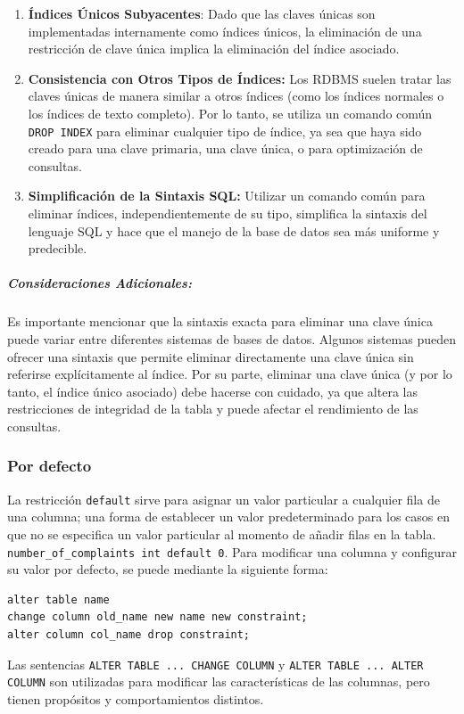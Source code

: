 \begin{enumerate}
    \item \textbf{Índices Únicos Subyacentes}: Dado que las claves únicas son implementadas internamente como índices únicos, la eliminación de una restricción de clave única implica la eliminación del índice asociado.
    \item \textbf{Consistencia con Otros Tipos de Índices:} Los RDBMS suelen tratar las claves únicas de manera similar a otros índices (como los índices normales o los índices de texto completo). Por lo tanto, se utiliza un comando común \texttt{DROP INDEX} para eliminar cualquier tipo de índice, ya sea que haya sido creado para una clave primaria, una clave única, o para optimización de consultas.
    \item \textbf{Simplificación de la Sintaxis SQL:} Utilizar un comando común para eliminar índices, independientemente de su tipo, simplifica la sintaxis del lenguaje SQL y hace que el manejo de la base de datos sea más uniforme y predecible.
\end{enumerate}

\subparagraph{Consideraciones Adicionales:} Es importante mencionar que la sintaxis exacta para eliminar una clave única puede variar entre diferentes sistemas de bases de datos. Algunos sistemas pueden ofrecer una sintaxis que permite eliminar directamente una clave única sin referirse explícitamente al índice. Por su parte, eliminar una clave única (y por lo tanto, el índice único asociado) debe hacerse con cuidado, ya que altera las restricciones de integridad de la tabla y puede afectar el rendimiento de las consultas.


\subsubsection{Por defecto}

La restricción \texttt{default} sirve para asignar un valor particular a cualquier fila de una columna; una forma de establecer un valor predeterminado para los casos en que no se especifica un valor particular al momento de añadir filas en la tabla. \texttt{number\_of\_complaints int default 0}.  Para modificar una columna y configurar su valor por defecto, se puede mediante la siguiente forma:
\begin{verbatim}
alter table name
change column old_name new name new constraint;
alter column col_name drop constraint;
\end{verbatim}
Las sentencias  \verb|ALTER TABLE ... CHANGE COLUMN| y \verb|ALTER TABLE ... ALTER COLUMN| son utilizadas para modificar las características de las columnas, pero tienen propósitos y comportamientos distintos. 

